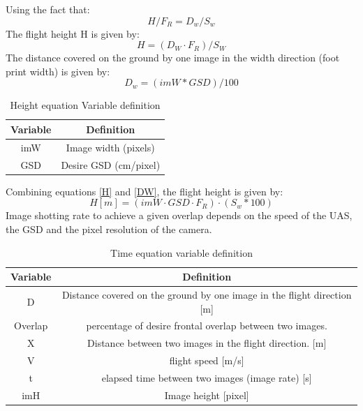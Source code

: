 Using the fact that:
\begin{equation}
H/F_{R} = D_{w}/S_{w}
\end{equation}
The flight height H is given by:
\begin{equation}
H = (D_{W}\cdot F_{R})/S_{W}
\label{H}
\end{equation}
The distance covered on the ground by one image in the width direction (foot print width) is given by:
\begin{equation}
D_{w}=(imW*GSD)/100
\label{DW}
\end{equation}
\begin{table}[H]
\centering
\begin{tabular}{|c|c|}
\hline
\textbf{Variable} & \textbf{Definition}   \\ \hline
imW              & Image width (pixels)  \\ \hline
GSD               & Desire GSD (cm/pixel) \\ \hline
\end{tabular}
\caption{Height equation Variable definition}
\end{table}
Combining equations \ref{H} and \ref{DW}, the flight height is given by:
\begin{equation}
H[m]=(imW\cdot GSD \cdot F_{R})\cdot (S_{w}*100)
\end{equation}
Image shotting rate to achieve a given overlap depends on the speed of the UAS, the GSD and the pixel resolution of the camera.
\begin{table}[H]
\centering
\begin{tabular}{|c|c|}
\hline
Variable & Definition                                                                  \\ \hline
D        & Distance covered on the ground by one image in the flight direction {[}m{]} \\ \hline
Overlap  & percentage of desire frontal overlap between two images.                    \\ \hline
X        & Distance between two images in the flight direction. {[}m{]}                \\ \hline
V        & flight speed {[}m/s{]}                                                      \\ \hline
t        & elapsed time between two images (image rate) {[}s{]}                        \\ \hline
imH      & Image height {[}pixel{]}                                                    \\ \hline
\end{tabular}
\caption{Time equation variable definition}
\end{table}
